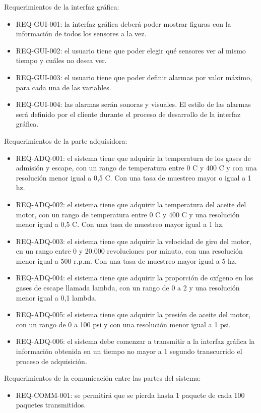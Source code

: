 Requerimientos de la interfaz gráfica:
\begin{itemize}
\item REQ-GUI-001: la interfaz gráfica deberá poder mostrar figuras con la información de todos los sensores a la vez.
\item REQ-GUI-002: el usuario tiene que poder elegir qué sensores ver al mismo tiempo y cuáles no desea ver.
\item REQ-GUI-003: el usuario tiene que poder definir alarmas por valor máximo, para cada una de las variables.
\item REQ-GUI-004: las alarmas serán sonoras y visuales. El estilo de las alarmas será definido por el cliente durante el proceso de desarrollo de la interfaz gráfica.
\end{itemize}

Requerimientos de la parte adquisidora:
\begin{itemize}
\item REQ-ADQ-001: el sistema tiene que adquirir la temperatura de los gases de admisión y escape, con un rango de temperatura entre 0 \degree C y 400 \degree C y con una resolución menor igual a 0,5 \degree C. Con una tasa de muestreo mayor o igual a 1 hz.
\item REQ-ADQ-002: el sistema tiene que adquirir la temperatura del aceite del motor, con un rango de temperatura entre 0 \degree C y 400 \degree C y una resolución menor igual a 0,5 \degree C. Con una tasa de muestreo mayor igual a 1 hz.
\item REQ-ADQ-003: el sistema tiene que adquirir la velocidad de giro del motor, en un rango entre 0 y 20.000 revoluciones por minuto, con una resolución menor igual a 500 r.p.m. Con una tasa de muestreo mayor igual a 5 hz.
\item REQ-ADQ-004: el sistema tiene que adquirir la proporción de oxígeno en los gases de escape llamada lambda, con un rango de 0 a 2 y una resolución menor igual a 0,1 lambda.
\item REQ-ADQ-005: el sistema tiene que adquirir la presión de aceite del motor, con un rango de 0 a 100 psi y con una resolución menor igual a 1 psi.
\item REQ-ADQ-006: el sistema debe comenzar a transmitir a la interfaz gráfica la información obtenida en un tiempo no mayor a 1 segundo transcurrido el proceso de adquisición.
\end{itemize}

Requerimientos de la comunicación entre las partes del sistema:
\begin{itemize}
\item REQ-COMM-001: se permitirá que se pierda hasta 1 paquete de cada 100 paquetes transmitidos.
\end{itemize}